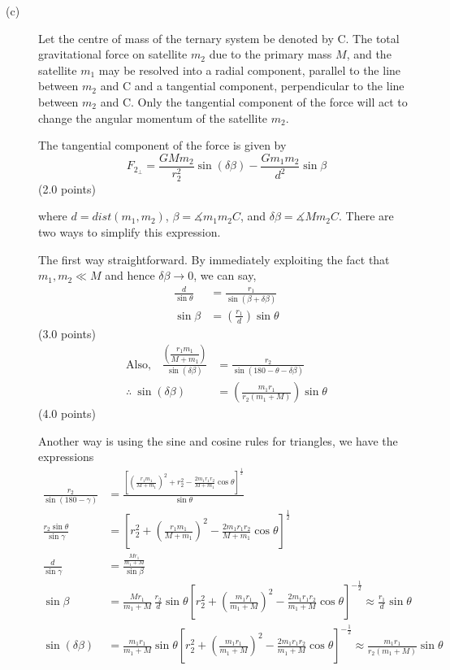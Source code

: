 \begin{description}
\item[(c)] Let the centre of mass of the ternary system be denoted by C. The
  total gravitational force on satellite $m_2$ due to the primary mass $M$,
  and the satellite $m_1$ may be resolved into a radial component, parallel to
  the line between $m_2$ and C and a tangential component, perpendicular to
  the line between $m_2$ and C. Only the tangential component of the force
  will act to change the angular momentum of the satellite $m_2$.

  The tangential component of the force is given by
  \[
    F_{2_\perp} = \frac{GMm_2}{r_2^2}\sin(\delta\beta)
      - \frac{Gm_1m_2}{d^2}\sin\beta
  \]
  \hfill(2.0 points)

  where $d = \mathit{dist}(m_1, m_2)$, $\beta = \measuredangle m_1 m_2 C$, and
  $\delta\beta = \measuredangle M m_2 C$. There are two ways to simplify this
  expression.

  The first way straightforward. By immediately exploiting the fact that %
  $m_1, m_2 \ll M$ and hence $\delta\beta \to 0$, we can say,
  \begin{align*}
    \frac{d}{\sin\theta} &= \frac{r_1}{\sin(\beta + \delta\beta)} \\
    \sin\beta &= \left(\frac{r_1}{d}\right)\sin\theta
  \end{align*}
  \hfill(3.0 points)
  \begin{align*}
    \text{Also,}\quad
    \frac{\left(\dfrac{r_1 m_1}{M + m_1}\right)}{\sin(\delta\beta)}
      &= \frac{r_2}{\sin(180 - \theta - \delta\beta)} \\
    \therefore\ \sin(\delta\beta)
      &= \left(\frac{m_1 r_1}{r_2(m_1 + M)}\right)\sin\theta
  \end{align*}
  \hfill(4.0 points)

  Another way is using the sine and cosine rules for triangles, we have the
  expressions
  \begin{align*}
    \frac{r_2}{\sin(180 - \gamma)}
      &= \frac{\left[\left(\frac{r_1 m_1}{M + m_1}\right)^2 + r_2^2
         - \frac{2m_1 r_1 r_2}{M + m_1}\cos\theta\right]^{\frac{1}{2}}}
         {\sin\theta} \\
    \frac{r_2\sin\theta}{\sin\gamma}
      &= \left[r_2^2 + \left(\frac{r_1 m_1}{M + m_1}\right)^2
         - \frac{2m_1 r_1 r_2}{M + m_1}\cos\theta\right]^{\frac{1}{2}} \\
    \frac{d}{\sin\gamma} &= \frac{\frac{Mr_1}{m_1 + M}}{\sin\beta} \\
    \sin\beta &= \frac{Mr_1}{m_1 + M}\,\frac{r_2}{d}\sin\theta
       \left[r_2^2 + \left(\frac{m_1 r_1}{m_1 + M}\right)^2
       - \frac{2m_1 r_1 r_2}{m_1 + M}\cos\theta\right]^{-\frac{1}{2}}
       \approx \frac{r_1}{d}\sin\theta \\
    \sin(\delta\beta) &= \frac{m_1 r_1}{m_1 + M}\sin\theta
       \left[r_2^2 + \left(\frac{m_1 r_1}{m_1 + M}\right)^2
       - \frac{2m_1 r_1 r_2}{m_1 + M}\cos\theta\right]^{-\frac{1}{2}}
       \approx \frac{m_1 r_1}{r_2(m_1 + M)}\sin\theta
  \end{align*}


\end{description}
